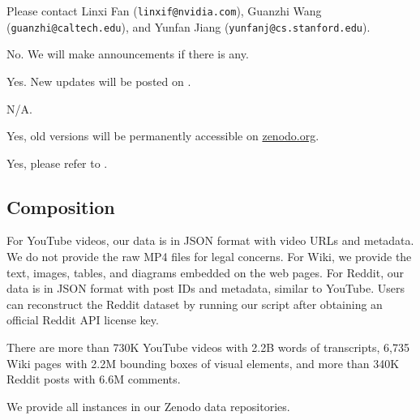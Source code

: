  Please contact Linxi Fan (\texttt{linxif@nvidia.com}), Guanzhi Wang (\texttt{guanzhi@caltech.edu}), and Yunfan Jiang (\texttt{yunfanj@cs.stanford.edu}).

 No. We will make announcements if there is any. 

 Yes. New updates will be posted on \weburl.

N/A.

 Yes, old versions will be permanently accessible on \href{https://zenodo.org}{zenodo.org}.

 Yes, please refer to \weburl.



\subsection{Composition}


For YouTube videos, our data is in JSON format with video URLs and metadata. We do not provide the raw MP4 files for legal concerns. For Wiki, we provide the text, images, tables, and diagrams embedded on the web pages. For Reddit, our data is in JSON format with post IDs and metadata, similar to YouTube. Users can reconstruct the Reddit dataset by running our script after obtaining an official Reddit API license key.    

 There are more than 730K YouTube videos with 2.2B words of transcripts, 6,735 Wiki pages with 2.2M bounding boxes of visual elements, and more than 340K Reddit posts with 6.6M comments.

 We provide all instances in our Zenodo data repositories. 


